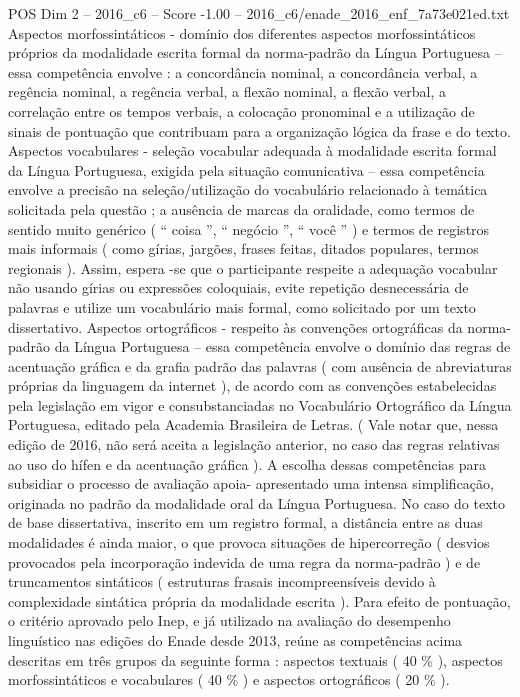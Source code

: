 \begin{textsample}{POS Dim 2 – 2016\_c6 – Score -1.00 – 2016\_c6/enade\_2016\_enf\_7a73e021ed.txt}
Aspectos morfossintáticos - domínio dos diferentes aspectos morfossintáticos próprios da modalidade escrita formal da norma-padrão da Língua Portuguesa – essa competência envolve : a concordância nominal, a concordância verbal, a regência nominal, a regência verbal, a flexão nominal, a flexão verbal, a correlação entre os tempos verbais, a colocação pronominal e a utilização de sinais de pontuação que contribuam para a organização lógica da frase e do texto.
Aspectos vocabulares - seleção vocabular adequada à modalidade escrita formal da Língua Portuguesa, exigida pela situação comunicativa – essa competência envolve a precisão na seleção/utilização do vocabulário relacionado à temática solicitada pela questão ; a ausência de marcas da oralidade, como termos de sentido muito genérico ( “ coisa ”, “ negócio ”, “ você ” ) e termos de registros mais informais ( como gírias, jargões, frases feitas, ditados populares, termos regionais ).
Assim, espera -se que o participante respeite a adequação vocabular não usando gírias ou expressões coloquiais, evite repetição desnecessária de palavras e utilize um vocabulário mais formal, como solicitado por um texto dissertativo.
Aspectos ortográficos - respeito às convenções ortográficas da norma-padrão da Língua Portuguesa – essa competência envolve o domínio das regras de acentuação gráfica e da grafia padrão das palavras ( com ausência de abreviaturas próprias da linguagem da internet ), de acordo com as convenções estabelecidas pela legislação em vigor e consubstanciadas no Vocabulário Ortográfico da Língua Portuguesa, editado pela Academia Brasileira de Letras. ( Vale notar que, nessa edição de 2016, não será aceita a legislação anterior, no caso das regras relativas ao uso do hífen e da acentuação gráfica ).
A escolha dessas competências para subsidiar o processo de avaliação apoia- apresentado uma intensa simplificação, originada no padrão da modalidade oral da Língua Portuguesa.
No caso do texto de base dissertativa, inscrito em um registro formal, a distância entre as duas modalidades é ainda maior, o que provoca situações de hipercorreção ( desvios provocados pela incorporação indevida de uma regra da norma-padrão ) e de truncamentos sintáticos ( estruturas frasais incompreensíveis devido à complexidade sintática própria da modalidade escrita ).
Para efeito de pontuação, o critério aprovado pelo Inep, e já utilizado na avaliação do desempenho linguístico nas edições do Enade desde 2013, reúne as competências acima descritas em três grupos da seguinte forma : aspectos textuais ( 40 \% ), aspectos morfossintáticos e vocabulares ( 40 \% ) e aspectos ortográficos ( 20 \% ).

\end{textsample}
